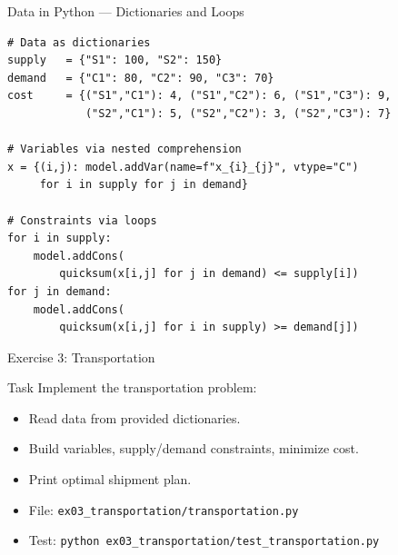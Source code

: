 \documentclass[aspectratio=169,10pt]{beamer}
\begin{document}
\begin{frame}[fragile]{Data in Python --- Dictionaries and Loops}
\begin{lstlisting}
# Data as dictionaries
supply   = {"S1": 100, "S2": 150}
demand   = {"C1": 80, "C2": 90, "C3": 70}
cost     = {("S1","C1"): 4, ("S1","C2"): 6, ("S1","C3"): 9,
            ("S2","C1"): 5, ("S2","C2"): 3, ("S2","C3"): 7}

# Variables via nested comprehension
x = {(i,j): model.addVar(name=f"x_{i}_{j}", vtype="C")
     for i in supply for j in demand}

# Constraints via loops
for i in supply:
    model.addCons(
        quicksum(x[i,j] for j in demand) <= supply[i])
for j in demand:
    model.addCons(
        quicksum(x[i,j] for i in supply) >= demand[j])
\end{lstlisting}
\end{frame}

\begin{frame}{Exercise 3: Transportation}
\begin{block}{Task}
Implement the transportation problem:
\begin{itemize}
  \item Read data from provided dictionaries.
  \item Build variables, supply/demand constraints, minimize cost.
  \item Print optimal shipment plan.
\end{itemize}
\end{block}
\begin{itemize}
  \item File: \texttt{ex03\_transportation/transportation.py}
  \item Test: \texttt{python ex03\_transportation/test\_transportation.py}
\end{itemize}
\end{frame}
\end{document}
